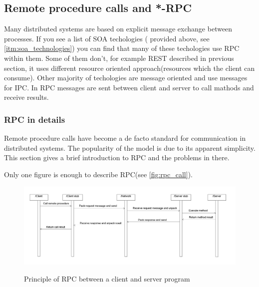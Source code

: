 \subsection{Remote procedure calls and *-RPC}
\label{sec:rpc}
Many distributed systems are based on explicit message exchange
between processes. If you see a list of SOA techologies ( provided above, see
\autoref{itm:soa_technologies}) you can find that many of these techologies use
RPC within them. Some of them don't, for example REST described in  previous
section, it uses different resource oriented approach(resources which
the client can consume). Other majority of techologies are message oriented and
use messages for \gls{IPC}. In RPC messages are sent between client and server
to call mathods and receive results. 

\subsubsection{RPC in details}
Remote procedure calls have become a de facto standard for communication
in distributed systems\cite{tanenbaum07}. The popularity of the model is due to
its apparent simplicity.
This section gives a brief introduction to RPC and the problems in there.

Only one figure is enough to describe RPC(see \autoref{fig:rpc_call}).

% 



\begin{figure}
\centering
\scalebox{0.4}
{\includegraphics{../images/preliminaries/rpc_diagram.png}}
\caption{Principle of RPC between a client and server program}
\label{fig:rpc_call}
\end{figure}


